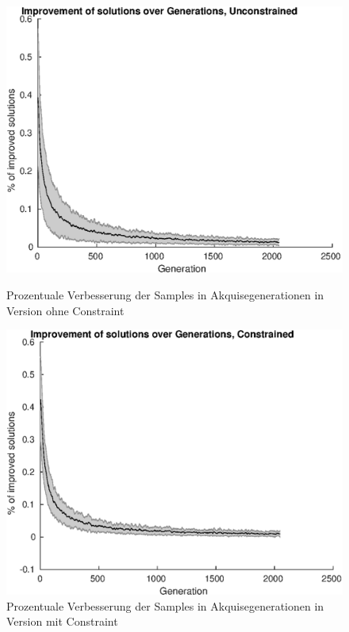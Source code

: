 \begin{figure}[h]
	\centering
	\begin{minipage}{0.45\textwidth}
		\centering
		\includegraphics[width=1\linewidth]{bilder/6pt1000Samples/acqImprovementsUncon}
		\caption{Prozentuale Verbesserung der Samples in Akquisegenerationen in Version ohne Constraint}
		\label{fig:acqImprovementUncon}
	\end{minipage}\hfill
	\begin{minipage}{0.45\textwidth}
		\centering
		\includegraphics[width=1\linewidth]{bilder/6pt1000Samples/acqImprovementsCon}
		\caption{Prozentuale Verbesserung der Samples in Akquisegenerationen in Version mit Constraint}
		\label{fig:acqImprovementCon}
	\end{minipage}
\end{figure}

